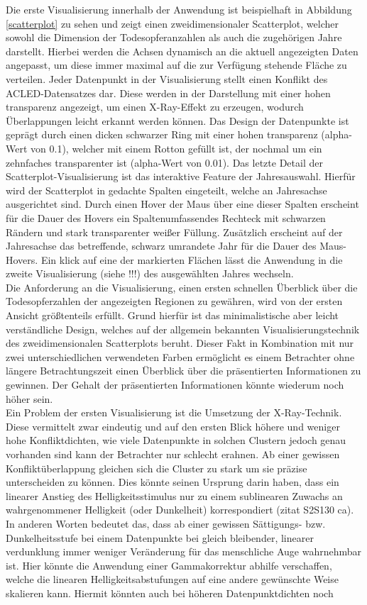 \documentclass[usegeometry=true]{scrartcl}
\begin{document}
Die erste Visualisierung innerhalb der Anwendung ist beispielhaft in Abbildung \ref{scatterplot} zu sehen und zeigt einen zweidimensionaler Scatterplot, welcher sowohl die Dimension der Todesopferanzahlen als auch die zugehörigen Jahre darstellt. Hierbei werden die Achsen dynamisch an die aktuell angezeigten Daten angepasst, um diese immer maximal auf die zur Verfügung stehende Fläche zu verteilen. Jeder Datenpunkt in der Visualisierung stellt einen Konflikt des ACLED-Datensatzes dar. Diese werden in der Darstellung mit einer hohen transparenz angezeigt, um einen X-Ray-Effekt zu erzeugen, wodurch Überlappungen leicht erkannt werden können. Das Design der Datenpunkte ist geprägt durch einen dicken schwarzer Ring mit einer hohen transparenz (alpha-Wert von 0.1), welcher mit einem Rotton gefüllt ist, der nochmal um ein zehnfaches transparenter ist (alpha-Wert von 0.01). Das letzte Detail der Scatterplot-Visualisierung ist das interaktive Feature der Jahresauswahl. Hierfür wird der Scatterplot in gedachte Spalten eingeteilt, welche an Jahresachse ausgerichtet sind. Durch einen Hover der Maus über eine dieser Spalten erscheint für die Dauer des Hovers ein Spaltenumfassendes Rechteck mit schwarzen Rändern und stark transparenter weißer Füllung. Zusätzlich erscheint auf der Jahresachse das betreffende, schwarz umrandete Jahr für die Dauer des Maus-Hovers. Ein klick auf eine der markierten Flächen lässt die Anwendung in die zweite Visualisierung (siehe !!!) des ausgewählten Jahres wechseln.\\ Die Anforderung an die Visualisierung, einen ersten schnellen Überblick über die Todesopferzahlen der angezeigten Regionen zu gewähren, wird von der ersten Ansicht größtenteils erfüllt. Grund hierfür ist das minimalistische aber leicht verständliche Design, welches auf der allgemein bekannten Visualisierungstechnik des zweidimensionalen Scatterplots beruht. Dieser Fakt in Kombination mit nur zwei unterschiedlichen verwendeten Farben ermöglicht es einem Betrachter ohne längere Betrachtungszeit einen Überblick über die präsentierten Informationen zu gewinnen. Der Gehalt der präsentierten Informationen könnte wiederum noch höher sein.\\ Ein Problem der ersten Visualisierung ist die Umsetzung der X-Ray-Technik. Diese vermittelt zwar eindeutig und auf den ersten Blick höhere und weniger hohe Konfliktdichten, wie viele Datenpunkte in solchen Clustern jedoch genau vorhanden sind kann der Betrachter nur schlecht erahnen. Ab einer gewissen Konfliktüberlappung gleichen sich die Cluster zu stark um sie präzise unterscheiden zu können. Dies könnte seinen Ursprung darin haben, dass ein linearer Anstieg des Helligkeitsstimulus nur zu einem sublinearen Zuwachs an wahrgenommener Helligkeit (oder Dunkelheit) korrespondiert (zitat S2S130 ca). In anderen Worten bedeutet das, dass ab einer gewissen Sättigungs- bzw. \glqq Dunkelheitsstufe\grqq{} bei einem Datenpunkte bei gleich bleibender, linearer verdunklung immer weniger Veränderung für das menschliche Auge wahrnehmbar ist. Hier könnte die Anwendung einer Gammakorrektur abhilfe verschaffen, welche die linearen Helligkeitsabstufungen auf eine andere gewünschte Weise skalieren kann. Hiermit könnten auch bei höheren Datenpunktdichten noch 
\end{document}
